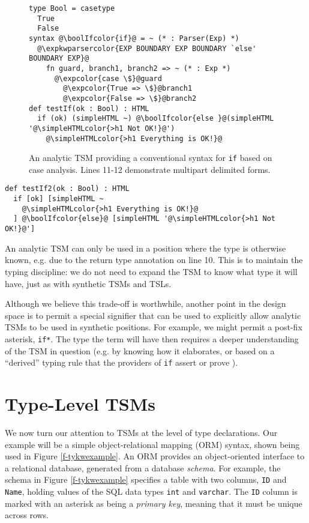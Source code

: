 \documentclass{sig-alternate}[10pt]
\newcommand{\lstinlinew}[1]{\lstinline[style=wyvern]{#1}}
\newcommand{\expkwparsercolor}[1]{\textcolor[HTML]{336699}{#1}}
\newcommand{\expcolor}[1]{\textcolor[HTML]{FF0033}{#1}}
\newcommand{\simpleHTMLcolor}[1]{\textcolor[HTML]{7D5100}{#1}}
\newcommand{\boolIfcolor}[1]{\textcolor[HTML]{5E0C0C}{#1}}
\newcommand{\mycaption}[1]{\vspace{-10px}\caption{#1}\vspace{-10px}}
\begin{document}
\begin{figure}[t]
\begin{lstlisting}[style=wyvern]
type Bool = casetype 
  True
  False
syntax @\boolIfcolor{if}@ = ~ (* : Parser(Exp) *)
  @\expkwparsercolor{EXP BOUNDARY EXP BOUNDARY `else' BOUNDARY EXP}@
    fn guard, branch1, branch2 => ~ (* : Exp *)
      @\expcolor{case \$}@guard
        @\expcolor{True => \$}@branch1
        @\expcolor{False => \$}@branch2
def testIf(ok : Bool) : HTML
  if (ok) (simpleHTML ~) @\boolIfcolor{else }@(simpleHTML '@\simpleHTMLcolor{>h1 Not OK!}@')
    @\simpleHTMLcolor{>h1 Everything is OK!}@
\end{lstlisting}
\mycaption{An analytic TSM providing a conventional syntax for \texttt{if} based on case analysis. Lines 11-12 demonstrate multipart delimited forms.}
\label{if-example}
\end{figure}
\begin{lstlisting}[style=wyvern]
def testIf2(ok : Bool) : HTML
  if [ok] [simpleHTML ~
    @\simpleHTMLcolor{>h1 Everything is OK!}@
  ] @\boolIfcolor{else}@ [simpleHTML '@\simpleHTMLcolor{>h1 Not OK!}@']
\end{lstlisting}

An analytic TSM can only be used in a position where the type is otherwise known, e.g. due to the return type annotation on line 10. This is to maintain the typing discipline: we do not need to expand the TSM to know what type it will have, just as with synthetic TSMs and TSLs. 

Although we believe this trade-off is worthwhile, another point in the design space is to permit a special signifier that can be used to explicitly allow analytic TSMs to be used in synthetic positions. For example, we might permit a post-fix asterisk, \lstinlinew{if*}. The type the term will have then requires a deeper understanding of the TSM in question (e.g. by knowing how it elaborates, or based on a ``derived'' typing rule that the providers of \lstinlinew{if} assert or prove \cite{conf/icfp/LorenzenE13}).


\section{Type-Level TSM\lowercase{s}}\label{tsms-type}
We now turn our attention to TSMs at the level of type declarations. Our example will be a simple object-relational mapping (ORM) syntax, shown being used in Figure \ref{f-tykwexample}. An ORM provides an object-oriented interface to a relational database, generated from a database \emph{schema}. For example, the schema in Figure \ref{f-tykwexample} specifies a table with two columns, \lstinlinew{ID} and \lstinlinew{Name}, holding values of the SQL data types \lstinlinew{int} and \lstinlinew{varchar}. The \lstinlinew{ID} column is marked with an asterisk as being a \emph{primary key}, meaning that it must be unique across rows. 
\end{document}
